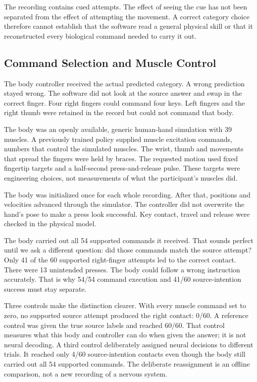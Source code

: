 The recording contains cued attempts. The effect of seeing the cue has not been
separated from the effect of attempting the movement. A correct category choice
therefore cannot establish that the software read a general physical skill or
that it reconstructed every biological command needed to carry it out.

\subsection{Command Selection and Muscle Control}

The body controller received the actual predicted category. A wrong prediction
stayed wrong. The software did not look at the source answer and swap in the
correct finger. Four right fingers could command four keys. Left fingers and
the right thumb were retained in the record but could not command that body.

The body was an openly available, generic human-hand simulation with 39 muscles.
A previously trained policy supplied muscle excitation commands, numbers that
control the simulated muscles. The wrist, thumb and movements that spread the
fingers were held by braces. The requested motion used fixed fingertip targets
and a half-second press-and-release pulse. These targets were engineering
choices, not measurements of what the participant's muscles did.

The body was initialized once for each whole recording. After that, positions
and velocities advanced through the simulator. The controller did not overwrite
the hand's pose to make a press look successful. Key contact, travel and release
were checked in the physical model.

The body carried out all 54 supported commands it received. That sounds perfect
until we ask a different question: did those commands match the source attempt?
Only 41 of the 60 supported right-finger attempts led to the correct contact.
There were 13 unintended presses. The body could follow a wrong instruction
accurately. That is why 54/54 command execution and 41/60 source-intention
success must stay separate.

Three controls make the distinction clearer. With every muscle command set to
zero, no supported source attempt produced the right contact: 0/60. A reference
control was given the true source labels and reached 60/60. That control measures
what this body and controller can do when given the answer; it is not neural
decoding. A third control deliberately assigned neural decisions to different
trials. It reached only 4/60 source-intention contacts even though the body still
carried out all 54 supported commands. The deliberate reassignment is an offline
comparison, not a new recording of a nervous system.

